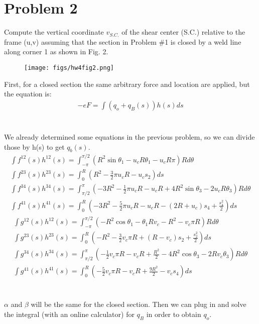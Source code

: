 \documentclass[12 pt]{article}
\begin{document}
\section*{Problem 2}
Compute the vertical coordinate $v_{S.C.}$ of the shear center (S.C.) relative to the frame (u,v)
assuming that the section in Problem \#1 is closed by a weld line along corner 1 as shown in Fig.
2.
\begin{figure}[!hbtp]
    \centering
    \texttt{[image: figs/hw4fig2.png]}
\end{figure} \par
\pagebreak
First, for a closed section the same arbitrary force and location are applied, but the equation is:
\begin{align*}
    -eF=\int(q_o+q_B(s))h(s)ds
\end{align*} \\ \\
We already determined some equations in the previous problem, so we can divide those by h(s) to get $q_b(s)$.
\begin{align*}
    \int{f^{12}(s)h^{12}(s)}=\int_{-\pi}^{\pi/2}(R^2\sin{\theta_1}-u_cR\theta_1-u_cR\pi)Rd\theta \\
    \int{f^{23}(s)h^{23}(s)}=\int_{0}^{R}(R^2-\frac{3}{2}\pi u_cR-u_cs_2)ds \\
    \int{f^{34}(s)h^{34}(s)}=\int_{\pi/2}^{\pi}(-3R^2-\frac{1}{2}\pi u_cR-u_cR+4R^2\sin{\theta_3}-2u_cR\theta_3)Rd\theta \\
    \int{f^{41}(s)h^{41}(s)}=\int_{0}^{R}(-3R^2-\frac{5}{2}\pi u_cR-u_cR-(2R+u_c)s_4+\frac{s_4^2}{2})ds
\end{align*}
\begin{align*}
    \int{g^{12}(s)h^{12}(s)}=\int_{-\pi}^{\pi/2}(-R^2\cos{\theta_1}-\theta_1Rv_c-R^2-v_c\pi R)Rd\theta \\
    \int{g^{23}(s)h^{23}(s)}=\int_{0}^{R}(-R^2-\frac{3}{2}v_c\pi R+(R-v_c)s_2+\frac{s_2^2}{2})ds \\
    \int{g^{34}(s)h^{34}(s)}=\int_{\pi/2}^{\pi}(-\frac{1}{2}v_c\pi R-v_cR+\frac{R^2}{2}-4R^2\cos{\theta_3}-2Rv_c\theta_3)Rd\theta \\
    \int{g^{41}(s)h^{41}(s)}=\int_{0}^{R}(-\frac{5}{2}v_c\pi R-v_cR+\frac{9R^2}{2}-v_cs_4)ds
\end{align*} \\ \\
$\alpha$ and $\beta$ will be the same for the closed section. Then we can plug in and solve the integral (with an online
calculator) for $q_B$ in order to obtain $q_o$.
\end{document}

